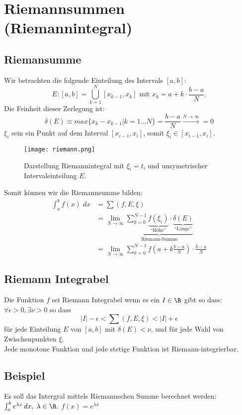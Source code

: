 \section{Riemannsummen (Riemannintegral)}
\subsection{Riemansumme}
Wir betrachten die folgende Einteilung des Intervals $[a,b]$:\[
E: [a,b] = \bigcup_{k=1}^{N}[x_{k-1}, x_k] \text{ mit } x_k = a + k \cdot \frac{b-a}{N}.
\]
Die Feinheit dieser Zerlegung ist:\[
\delta(E) \equiv max\{x_k - x_{k-1}|k = 1...N\} = \frac{b-a}{N} \xrightarrow{N \to \infty} = 0
\]
$\xi_i$ sein ein Punkt auf dem Interval $[x_{i-1}, x_i]$, somit $\xi_i \in[x_{i-1}, x_i]$.\\

\begin{figure}
	\texttt{[image: riemann.png]}
	\caption[Bildunterschrift]{Darstellung Riemannintegral mit $\xi_i = t_i$ und unsymetrischer Intervaleinteilung $E$.}
\end{figure}

Somit können wir die Riemannsumme bilden:
\begin{align*}
\int_a^b f(x)\;dx &=\sum (f,E,\xi)\\
&= \lim_{N \to \infty} \underbrace{\sum_{k=0}^{N-1}
\underbrace{f(\xi_i)}_{\text{``Höhe''}} \cdot
\underbrace{\delta(E)}_{\text{``Länge''}}}_{\text{Riemann-Summe}}\\
&= \lim_{N \to \infty} \sum_{k=0}^{N-1} {f(a +
k\frac{b-a}{N})} \cdot \frac{b-a}{N}
\end{align*}


\subsection{Riemann Integrabel}
Die Funktion $f$ sei Riemann Integrabel wenn es ein $I \in \R$ gibt so dass: $\forall \epsilon > 0, \exists \nu > 0$ so dass \[
|I| - \epsilon < \sum (f,E,\xi) < |I| + \epsilon
\]
für jede Einteilung $E$ von $[a,b]$ mit $\delta(E) < \nu$, und für jede Wahl von Zwischenpunkten $\xi$.\\
Jede monotone Funktion und jede stetige Funktion ist Riemann-integrierbar.
\subsection{Beispiel}
Es soll das Intergral mittels Riemannschen Summe berechnet werden: $\int_a^b
e^{\lambda x}\,dx, \; \lambda \in \R$. $f(x) = e^{\lambda x}$

